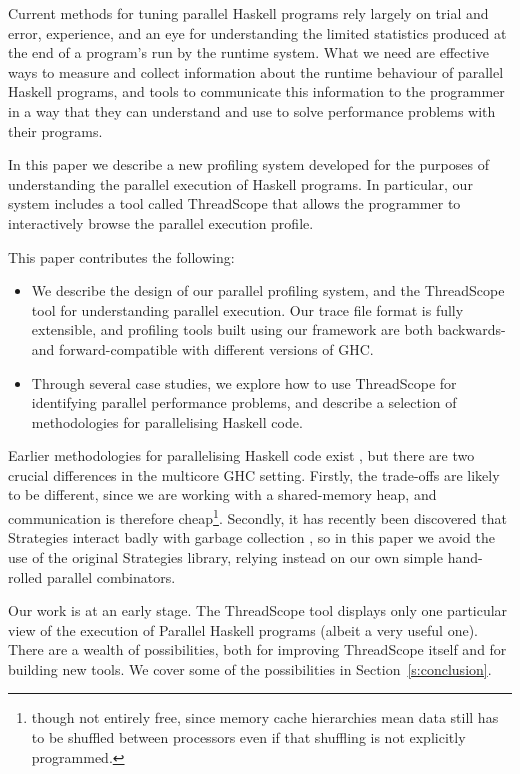 \documentclass[twocolumn,9pt]{sigplanconf}
\let\cite=\citep
\begin{document}
Current methods for tuning parallel Haskell programs rely largely on
trial and error, experience, and an eye for understanding the limited
statistics produced at the end of a program's run by the runtime
system.  What we need are effective ways to measure and collect
information about the runtime behaviour of parallel Haskell programs,
and tools to communicate this information to the programmer in a
way that they can understand and use to solve performance problems
with their programs.

In this paper we describe a new profiling system developed for the
purposes of understanding the parallel execution of Haskell programs.
In particular, our system includes a tool called ThreadScope that
allows the programmer to interactively browse the parallel execution
profile.

This paper contributes the following:

\begin{itemize}
\item We describe the design of our parallel profiling system, and
  the ThreadScope tool for understanding parallel execution.  Our
  trace file format is fully extensible, and profiling tools built
  using our framework are both backwards- and forward-compatible with
  different versions of GHC.

\item Through several case studies, we explore how to use ThreadScope
  for identifying parallel performance problems, and describe a
  selection of methodologies for parallelising Haskell code.
\end{itemize}

Earlier methodologies for parallelising Haskell code exist
\cite{spj:trin98b}, but there are two crucial differences in the
multicore GHC setting.  Firstly, the trade-offs are likely to be
different, since we are working with a shared-memory heap, and
communication is therefore cheap\footnote{though not entirely free,
  since memory cache hierarchies mean data still has to be shuffled
  between processors even if that shuffling is not explicitly
  programmed.}.  Secondly, it has recently been discovered that
Strategies interact badly with garbage collection
\cite{multicore-ghc}, so in this paper we avoid the use of the
original Strategies library, relying instead on our own simple
hand-rolled parallel combinators.

Our work is at an early stage.  The ThreadScope tool displays only one
particular view of the execution of Parallel Haskell programs (albeit
a very useful one).  There are a wealth of possibilities, both for
improving ThreadScope itself and for building new tools.  We cover
some of the possibilities in Section~\ref{s:conclusion}.
\end{document}
